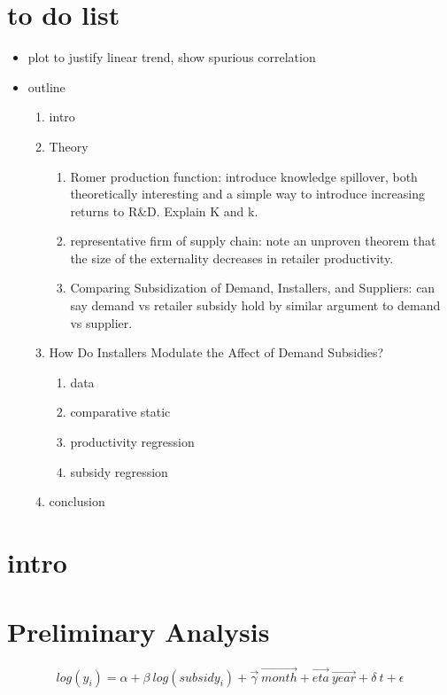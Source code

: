 \documentclass{article}
\begin{document}
\section*{to do list}

\begin{itemize}
	\item plot to justify linear trend, show spurious correlation
	\item outline
	\begin{enumerate}
		\item intro
		\item Theory
		\begin{enumerate}
			\item Romer production function: introduce knowledge spillover, both theoretically interesting and a simple way to introduce increasing returns to R\&D. Explain K and k.
			\item representative firm of supply chain: note an unproven theorem that the size of the externality decreases in retailer productivity.
			\item Comparing Subsidization of Demand, Installers, and Suppliers: can say demand vs retailer subsidy hold by similar argument to demand vs supplier.
		\end{enumerate}
		\item How Do Installers Modulate the Affect of Demand Subsidies?
		\begin{enumerate}
			\item data
			\item comparative static
			\item productivity regression
			\item subsidy regression
			\end{enumerate}
		\item conclusion
	\end{enumerate}
\end{itemize}

\section{intro}

\section{Preliminary Analysis}

\begin{equation}
log(y_i) = \alpha + \beta ~ log(subsidy_i) + \vec{\gamma} ~ \vec{month} + \vec{eta} ~ \vec{year} + \delta~ t + \epsilon
\end{equation}
\end{document}
